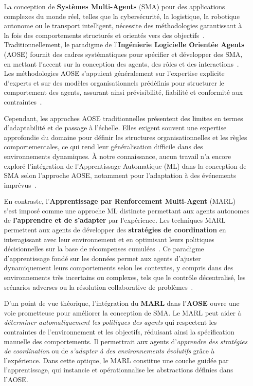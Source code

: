 \documentclass[pdflatex,sn-mathphys-num]{sn-jnl}%
\theoremstyle{thmstyleone}%
\theoremstyle{thmstyletwo}%
\theoremstyle{thmstylethree}%
\begin{document}
La conception de \textbf{Systèmes Multi-Agents} (SMA) pour des applications complexes du monde réel, telles que la cybersécurité, la logistique, la robotique autonome ou le transport intelligent, nécessite des méthodologies garantissant à la fois des comportements structurés et orientés vers des objectifs~\cite{Jamont2O15}. Traditionnellement, le paradigme de l'\textbf{Ingénierie Logicielle Orientée Agents} (AOSE) fournit des cadres systématiques pour spécifier et développer des SMA, en mettant l'accent sur la conception des agents, des rôles et des interactions~\cite{Pavon2003, Bernon2005}. Les méthodologies AOSE s'appuient généralement sur l'expertise explicite d'experts et sur des modèles organisationnels prédéfinis pour structurer le comportement des agents, assurant ainsi prévisibilité, fiabilité et conformité aux contraintes~\cite{Hindriks2014}.

Cependant, les approches AOSE traditionnelles présentent des limites en termes d'adaptabilité et de passage à l'échelle. Elles exigent souvent une expertise approfondie du domaine pour définir les structures organisationnelles et les règles comportementales, ce qui rend leur généralisation difficile dans des environnements dynamiques. À notre connaissance, aucun travail n'a encore exploré l'intégration de l'Apprentissage Automatique (ML) dans la conception de SMA selon l'approche AOSE, notamment pour l'adaptation à des événements imprévus~\cite{Garcia2004}.

En contraste, l'\textbf{Apprentissage par Renforcement Multi-Agent} (MARL) s'est imposé comme une approche ML distincte permettant aux agents autonomes de \textbf{l'apprendre et de s'adapter} par l'expérience. Les techniques MARL permettent aux agents de développer des \textbf{stratégies de coordination} en interagissant avec leur environnement et en optimisant leurs politiques décisionnelles sur la base de récompenses cumulées~\cite{Zhang2021}. Ce paradigme d'apprentissage fondé sur les données permet aux agents d'ajuster dynamiquement leurs comportements selon les contextes, y compris dans des environnements très incertains ou complexes, tels que le contrôle décentralisé, les scénarios adverses ou la résolution collaborative de problèmes~\cite{Papoudakis2021}.

D'un point de vue théorique, l'intégration du \textbf{MARL} dans l'\textbf{AOSE} ouvre une voie prometteuse pour améliorer la conception de SMA. Le MARL peut aider à \textit{déterminer automatiquement les politiques des agents} qui respectent les contraintes de l'environnement et les objectifs, réduisant ainsi la spécification manuelle des comportements. Il permettrait aux agents d'\textit{apprendre des stratégies de coordination} ou de \textit{s'adapter à des environnements évolutifs} grâce à l'expérience. Dans cette optique, le MARL constitue une couche guidée par l'apprentissage, qui instancie et opérationnalise les abstractions définies dans l'AOSE.
\end{document}
